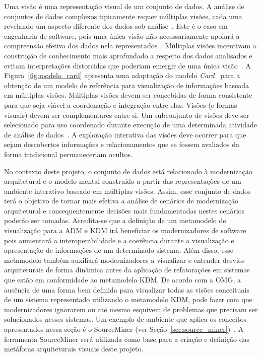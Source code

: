 \documentclass[12pt]{article}
\begin{document}
Uma visão é uma representação visual de um conjunto de dados. A análise de conjuntos de dados complexos tipicamente requer múltiplas visões, cada uma revelando um aspecto diferente dos dados sob análise~\cite{Boukhelifa_2003}. Este é o caso em engenharia de software, pois uma única visão não necessariamente apoiará a compreensão efetiva dos dados nela representados~\cite{Storey_2006}. Múltiplas visões incentivam a construção de conhecimento mais aprofundado a respeito dos dados analisados e evitam interpretações distorcidas que poderiam emergir de uma única visão~\cite{Ainsworth_1999}. A Figura~\ref{fig:modelo_card} apresenta uma adaptação do modelo \textit{Card}~\cite{source_miner_glauco} para a obtenção de um modelo de referência para visualização de informações baseada em múltiplas visões. Múltiplas visões devem ser concebidas de forma consistente para que seja viável a coordenação e integração entre elas. Visões (e formas visuais) devem ser complementares entre si. Um subconjunto de visões deve ser selecionado para uso coordenado durante execução de uma determinada atividade de análise de dados~\cite{WangBaldonado_2000}. A exploração interativa das visões deve ocorrer para que sejam descobertos informações e relacionamentos que se fossem avaliados da forma tradicional permaneceriam ocultos. 

No contexto deste projeto, o conjunto de dados está relacionado à modernização arquitetural e o modelo mental construído a partir das representações de um ambiente interativo baseado em múltiplas visões. Assim, esse conjunto de dados terá o objetivo de tornar mais efetiva a análise de cenários de modernização arquitetural e consequentemente decisões mais fundamentadas nestes cenários poderão ser tomadas. Acredita-se que a definição de um metamodelo de visualização para a ADM e KDM irá beneficiar os modernizadores de software pois aumentará a interoperabilidade e a coerência durante a visualização e apresentação de informações de um determinado sistema. Além disso, esse metamodelo também auxiliará modernizadores a visualizar e entender desvios arquiteturais de forma dinâmica antes da aplicação de refatorações em sistemas que estão em conformidade ao metamodelo KDM. De acordo com a OMG, a ausência de uma forma bem definida para visualizar todas as visões conceituais de um sistema representado utilizando o metamodelo KDM, pode fazer com que modernizadores ignorarem ou até mesmo esquivem de problemas que precisam ser solucionados nesses sistemas. Um exemplo de ambiente que aplica os conceitos apresentados nessa seção é o SourceMiner (ver Seção~\ref{sec:source_miner})~\cite{source_miner_glauco}. A ferramenta  SourceMiner será utilizada como base para a criação e definição das metáforas arquiteturais visuais deste projeto. 
\end{document}
